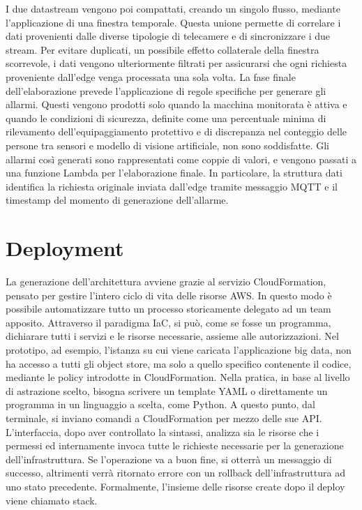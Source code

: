I due datastream vengono poi compattati, creando un singolo flusso, mediante l'applicazione di una finestra temporale. Questa unione permette di correlare i dati provenienti dalle diverse tipologie di telecamere e di sincronizzare i due stream. Per evitare duplicati, un possibile effetto collaterale della finestra scorrevole, i dati vengono ulteriormente filtrati per assicurarsi che ogni richiesta proveniente dall'edge venga processata una sola volta. La fase finale dell'elaborazione prevede l'applicazione di regole specifiche per generare gli allarmi. Questi vengono prodotti solo quando la macchina monitorata è attiva e quando le condizioni di sicurezza, definite come una percentuale minima di rilevamento dell'equipaggiamento protettivo e di discrepanza nel conteggio delle persone tra sensori e modello di visione artificiale, non sono soddisfatte. Gli allarmi così generati sono rappresentati come coppie di valori, e vengono passati a una funzione Lambda per l'elaborazione finale. In particolare, la struttura dati identifica la richiesta originale inviata dall'edge tramite messaggio MQTT e il timestamp del momento di generazione dell'allarme.



\section{Deployment}

La generazione dell'architettura avviene grazie al servizio CloudFormation, pensato per gestire l'intero ciclo di vita delle risorse AWS. In questo modo è possibile automatizzare tutto un processo storicamente delegato ad un team apposito. Attraverso il paradigma IaC, si può, come se fosse un programma, dichiarare tutti i servizi e le risorse necessarie, assieme alle autorizzazioni. Nel prototipo, ad esempio, l'istanza su cui viene caricata l'applicazione big data, non ha accesso a tutti gli object store, ma solo a quello specifico contenente il codice, mediante le policy introdotte in CloudFormation. Nella pratica, in base al livello di astrazione scelto, bisogna scrivere un template YAML o direttamente un programma in un linguaggio a scelta, come Python. A questo punto, dal terminale, si inviano comandi a CloudFormation per mezzo delle sue API. L'interfaccia, dopo aver controllato la sintassi, analizza sia le risorse che i permessi ed internamente invoca tutte le richieste necessarie per la generazione dell'infrastruttura. Se l'operazione va a buon fine, si otterrà un messaggio di successo, altrimenti verrà ritornato errore con un rollback dell'infrastruttura ad uno stato precedente. Formalmente, l'insieme delle risorse create dopo il deploy viene chiamato stack. 

